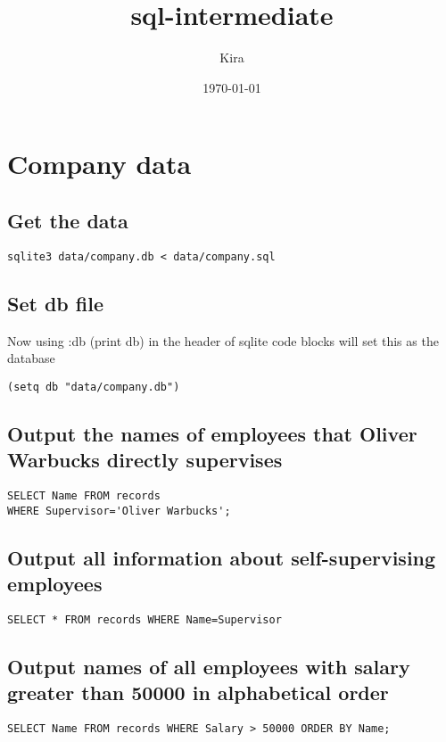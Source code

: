 \documentclass[11pt]{article}
\author{Kira}
\date{\today}
\title{sql-intermediate}
\begin{document}
\maketitle
\tableofcontents

\section{Company data}
\label{sec-1}
\subsection{Get the data}
\label{sec-1-1}
\begin{verbatim}
sqlite3 data/company.db < data/company.sql
\end{verbatim}

\subsection{Set db file}
\label{sec-1-2}
Now using :db (print db) in the header of sqlite code blocks will set this as the database
\begin{verbatim}
(setq db "data/company.db")
\end{verbatim}

\subsection{Output the names of employees that Oliver Warbucks directly supervises}
\label{sec-1-3}
\begin{verbatim}
SELECT Name FROM records 
WHERE Supervisor='Oliver Warbucks';
\end{verbatim}

\subsection{Output all information about self-supervising employees}
\label{sec-1-4}
\begin{verbatim}
SELECT * FROM records WHERE Name=Supervisor
\end{verbatim}

\subsection{Output names of all employees with salary greater than 50000 in alphabetical order}
\label{sec-1-5}
\begin{verbatim}
SELECT Name FROM records WHERE Salary > 50000 ORDER BY Name;
\end{verbatim}
\end{document}
